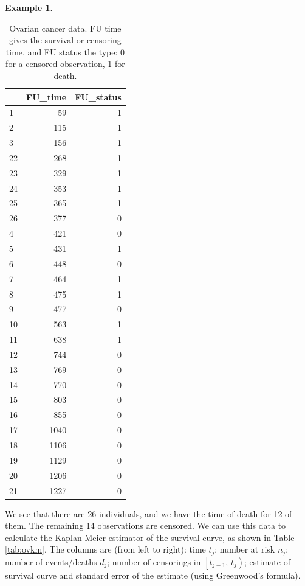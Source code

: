 \documentclass[
  openany]{book}
\theoremstyle{definition}
\theoremstyle{definition}
\newtheorem{example}{Example}[chapter]
\theoremstyle{definition}
\theoremstyle{definition}
\theoremstyle{remark}
\begin{document}
\begin{example}
\begin{table}
\centering
\caption{\label{tab:ovdata}Ovarian cancer data. FU time gives the survival or censoring time, and FU status the type: 0 for a censored observation, 1 for death. }
\centering
\begin{tabular}[t]{l|r|r}
\hline
  & FU\_time & FU\_status\\
\hline
1 & 59 & 1\\
\hline
2 & 115 & 1\\
\hline
3 & 156 & 1\\
\hline
22 & 268 & 1\\
\hline
23 & 329 & 1\\
\hline
24 & 353 & 1\\
\hline
25 & 365 & 1\\
\hline
26 & 377 & 0\\
\hline
4 & 421 & 0\\
\hline
5 & 431 & 1\\
\hline
6 & 448 & 0\\
\hline
7 & 464 & 1\\
\hline
8 & 475 & 1\\
\hline
9 & 477 & 0\\
\hline
10 & 563 & 1\\
\hline
11 & 638 & 1\\
\hline
12 & 744 & 0\\
\hline
13 & 769 & 0\\
\hline
14 & 770 & 0\\
\hline
15 & 803 & 0\\
\hline
16 & 855 & 0\\
\hline
17 & 1040 & 0\\
\hline
18 & 1106 & 0\\
\hline
19 & 1129 & 0\\
\hline
20 & 1206 & 0\\
\hline
21 & 1227 & 0\\
\hline
\end{tabular}
\end{table}

We see that there are 26 individuals, and we have the time of death for 12 of them. The remaining 14 observations are censored.
We can use this data to calculate the Kaplan-Meier estimator of the survival curve, as shown in Table \ref{tab:ovkm}. The columns are (from left to right): time \(t_j\); number at risk \(n_j\); number of events/deaths \(d_j\); number of censorings in \(\left[t_{j-1},\,t_j\right)\); estimate of survival curve and standard error of the estimate (using Greenwood's formula).


\end{example}
\end{document}
